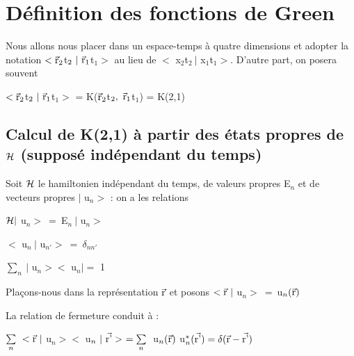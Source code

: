 \section{Définition des fonctions de Green}%

Nous allons nous placer dans un espace-temps à quatre dimensions
et adopter la notation $<\vec{\text{r}}_2$t$_2\ |\ \vec{\mt{r}}_1$t$_1>$ au lieu de $<$ x$_2$t$_2\ |$ x$_1$t$_1>$.
D'autre part, on posera souvent
\begin{center}
$<\vec{\text{r}}_2$t$_2\ |\ \vec{\mt{r}}_1$t$_1>$ = K($\vec{\text{r}}_2$t$_2,\ \vec{\mt{r}}_1$t$_1$) = K(2,1)
\end{center}

\subsection{Calcul de K(2,1) à partir des états propres de $\mathcal{H}$ (supposé
indépendant du temps)}%

Soit $\mathcal{H}$ le hamiltonien indépendant du temps, de valeurs propres
E$_n$ et de vecteurs propres $|$ u$_n>$ : on a les relations
\begin{center}
$\mathcal{H}|$ u$_n>\ =\ $E$_n\ |$ u$_n>$

$<$ u$_n\ |$ u$_{n'}>\ =\ \delta_{nn'}$ 

$\underset{n}{\sum}\ |$ u$_n><$ u$_n|=$ 1
\end{center}
Plaçons-nous dans la représentation $\vec{\text{r}}$ et posons  $<\vec{\text{r}}\ |$ u$_n>\ =\ $u$_n(\vec{\text{r}})$

La relation de fermeture conduit à :
\begin{center}
$\underset{n}{\sum}\ <\vec{\mt{r}}\ |$ u$_n><$ u$_n\ |\ \vec{\text{r'}}>\ =
\underset{n}{\sum}\ $ u$_n(\vec{\text{r}})$ u$^*_n(\vec{\text{r'}})=
\delta(\vec{\text{r}}-\vec{\text{r'}})$ 
\end{center}

